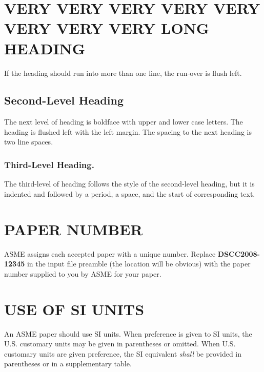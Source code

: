 \documentclass[twocolumn,10pt]{asme2e}
\begin{document}
\section*{VERY VERY VERY VERY VERY VERY VERY VERY LONG HEADING}

If the heading should run into more than one line, the run-over is flush left.

\subsection*{Second-Level Heading}

The next level of heading is boldface with upper and lower
case letters. The heading is flushed left with the left
margin. The spacing to the next heading is two line spaces.

\subsubsection*{Third-Level Heading.}

The third-level of heading follows the style of the
second-level heading, but it is indented and followed by a
period, a space, and the start of corresponding text.

\section*{PAPER NUMBER}

ASME assigns each accepted paper with a unique number.
Replace {\bf DSCC2008-12345} in the input file preamble
(the location will be obvious) with the paper number
supplied to you by ASME for your paper.


\section*{USE OF SI UNITS}

An ASME paper should use SI units.  When preference is
given to SI units, the U.S. customary units may be given in
parentheses or omitted. When U.S. customary units are given
preference, the SI equivalent {\em shall} be provided in
parentheses or in a supplementary table.
\end{document}
